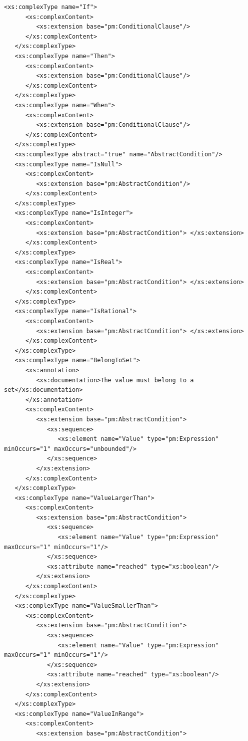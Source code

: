 \documentclass[a4paper,11pt] {ivoa}
\begin{document}
\begin{lstlisting}[style=listXML]
   <xs:complexType name="If">
      <xs:complexContent>
         <xs:extension base="pm:ConditionalClause"/>
      </xs:complexContent>
   </xs:complexType>
   <xs:complexType name="Then">
      <xs:complexContent>
         <xs:extension base="pm:ConditionalClause"/>
      </xs:complexContent>
   </xs:complexType>
   <xs:complexType name="When">
      <xs:complexContent>
         <xs:extension base="pm:ConditionalClause"/>
      </xs:complexContent>
   </xs:complexType>
   <xs:complexType abstract="true" name="AbstractCondition"/>
   <xs:complexType name="IsNull">
      <xs:complexContent>
         <xs:extension base="pm:AbstractCondition"/>
      </xs:complexContent>
   </xs:complexType>
   <xs:complexType name="IsInteger">
      <xs:complexContent>
         <xs:extension base="pm:AbstractCondition"> </xs:extension>
      </xs:complexContent>
   </xs:complexType>
   <xs:complexType name="IsReal">
      <xs:complexContent>
         <xs:extension base="pm:AbstractCondition"> </xs:extension>
      </xs:complexContent>
   </xs:complexType>
   <xs:complexType name="IsRational">
      <xs:complexContent>
         <xs:extension base="pm:AbstractCondition"> </xs:extension>
      </xs:complexContent>
   </xs:complexType>
   <xs:complexType name="BelongToSet">
      <xs:annotation>
         <xs:documentation>The value must belong to a set</xs:documentation>
      </xs:annotation>
      <xs:complexContent>
         <xs:extension base="pm:AbstractCondition">
            <xs:sequence>
               <xs:element name="Value" type="pm:Expression" minOccurs="1" maxOccurs="unbounded"/>
            </xs:sequence>
         </xs:extension>
      </xs:complexContent>
   </xs:complexType>
   <xs:complexType name="ValueLargerThan">
      <xs:complexContent>
         <xs:extension base="pm:AbstractCondition">
            <xs:sequence>
               <xs:element name="Value" type="pm:Expression" maxOccurs="1" minOccurs="1"/>
            </xs:sequence>
            <xs:attribute name="reached" type="xs:boolean"/>
         </xs:extension>
      </xs:complexContent>
   </xs:complexType>
   <xs:complexType name="ValueSmallerThan">
      <xs:complexContent>
         <xs:extension base="pm:AbstractCondition">
            <xs:sequence>
               <xs:element name="Value" type="pm:Expression" maxOccurs="1" minOccurs="1"/>
            </xs:sequence>
            <xs:attribute name="reached" type="xs:boolean"/>
         </xs:extension>
      </xs:complexContent>
   </xs:complexType>
   <xs:complexType name="ValueInRange">
      <xs:complexContent>
         <xs:extension base="pm:AbstractCondition">

\end{lstlisting}
\end{document}
